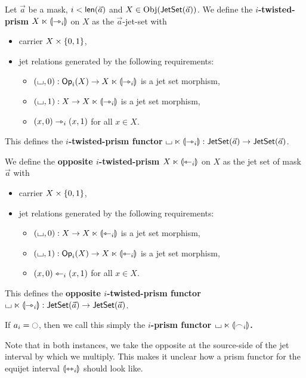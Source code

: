 \documentclass[a4paper]{memoir}
\begin{document}
\begin{definition} \label{def:prism}
	Let $\vec a$ be a mask, $i < \mathsf{len}(\vec a)$ and $X \in \mathrm{Obj}(\mathsf{JetSet}(\vec a))$.
	We define the \textbf{$i$-twisted-prism $X \ltimes {\llparenthesis \rightarrowtriangle_i \rrparenthesis}$} on $X$ as the $\vec a$-jet-set with
	\begin{itemize}
		\item carrier $X \times \mathopen{}\left\{ 0, 1 \right\}\mathclose{}$,
		\item jet relations generated by the following requirements:
		\begin{itemize}
			\item $({\llcorner\hspace{-.4ex}\lrcorner}, 0) : {\mathsf{Op}}_i(X) \to X \ltimes {\llparenthesis \rightarrowtriangle_i \rrparenthesis}$ is a jet set morphism,
			\item $({\llcorner\hspace{-.4ex}\lrcorner}, 1) : X \to X \ltimes {\llparenthesis \rightarrowtriangle_i \rrparenthesis}$ is a jet set morphism,
			\item $(x, 0) \rightarrowtriangle_i (x, 1)$ for all $x \in X$.
		\end{itemize}
	\end{itemize}
	This defines the \textbf{$i$-twisted-prism functor} ${\llcorner\hspace{-.4ex}\lrcorner} \ltimes {\llparenthesis \rightarrowtriangle_i \rrparenthesis} : \mathsf{JetSet}(\vec a) \to \mathsf{JetSet}(\vec a)$.
	
	We define the \textbf{opposite $i$-twisted-prism $X \ltimes {\llparenthesis \leftarrowtriangle_i \rrparenthesis}$} on $X$ as the jet set of mask $\vec a$ with
	\begin{itemize}
		\item carrier $X \times \mathopen{}\left\{ 0, 1 \right\}\mathclose{}$,
		\item jet relations generated by the following requirements:
		\begin{itemize}
			\item $({\llcorner\hspace{-.4ex}\lrcorner}, 0) : X \to X \ltimes {\llparenthesis \leftarrowtriangle_i \rrparenthesis}$ is a jet set morphism,
			\item $({\llcorner\hspace{-.4ex}\lrcorner}, 1) : {\mathsf{Op}}_i(X) \to X \ltimes {\llparenthesis \leftarrowtriangle_i \rrparenthesis}$ is a jet set morphism,
			\item $(x, 0) \leftarrowtriangle_i (x, 1)$ for all $x \in X$.
		\end{itemize}
	\end{itemize}
	This defines the \textbf{opposite $i$-twisted-prism functor} ${\llcorner\hspace{-.4ex}\lrcorner} \ltimes {\llparenthesis \rightarrowtriangle_i \rrparenthesis} : \mathsf{JetSet}(\vec a) \to \mathsf{JetSet}(\vec a)$.
	
	If $a_i = \npolar$, then we call this simply the \textbf{$i$-prism functor ${\llcorner\hspace{-.4ex}\lrcorner} \ltimes {\llparenthesis \frown_i \rrparenthesis}$.}
\end{definition}
Note that in both instances, we take the opposite at the source-side of the jet interval by which we multiply. This makes it unclear how a prism functor for the equijet interval ${\llparenthesis \leftrightarrowtriangle_i \rrparenthesis}$ should look like.
\end{document}
